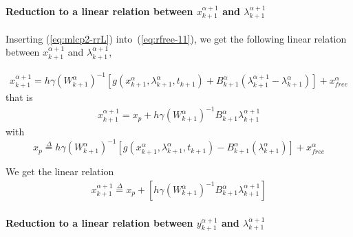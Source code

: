 \paragraph{Reduction to a linear relation between  $x^{\alpha+1}_{k+1}$ and
$\lambda^{\alpha+1}_{k+1}$}

Inserting (\ref{eq:mlcp2-rrL}) into~(\ref{eq:rfree-11}), we get the following linear relation between $x^{\alpha+1}_{k+1}$ and
$\lambda^{\alpha+1}_{k+1}$, 

\begin{equation}
   \begin{array}{l}
     x^{\alpha+1}_{k+1} = h\gamma(W^{\alpha}_{k+1} )^{-1}\left[g(x^{\alpha}_{k+1},\lambda^{\alpha}_{k+1},t_{k+1}) +
    B^{\alpha}_{k+1} (\lambda^{\alpha+1}_{k+1} - \lambda^{\alpha}_{k+1}) \right ] +x^\alpha_{free}
\end{array}
\end{equation}
that is 
\begin{equation}
  \begin{array}{l}
   x^{\alpha+1}_{k+1} =x_p + h \gamma (W^{\alpha}_{k+1})^{-1}    B^{\alpha}_{k+1} \lambda^{\alpha+1}_{k+1}
   \end{array}
\end{equation}
with 
\begin{equation}
  \boxed{x_p \stackrel{\Delta}{=}  h\gamma(W^{\alpha}_{k+1} )^{-1}\left[g(x^{\alpha}_{k+1},\lambda^{\alpha}_{k+1},t_{k+1}) 
    -B^{\alpha}_{k+1} (\lambda^{\alpha}_{k+1}) \right ] +x^\alpha_{free}}
\end{equation}


We get the linear relation
\begin{equation}
  \label{eq:mlcp2-rfree-13}
  \begin{array}{l}
 \boxed{   x^{\alpha+1}_{k+1}\stackrel{\Delta}{=} x_p + \left[ h \gamma (W^{\alpha}_{k+1})^{-1}    B^{\alpha}_{k+1} \lambda^{\alpha+1}_{k+1}\right]}
   \end{array}
\end{equation}




\paragraph{Reduction to a linear relation between  $y^{\alpha+1}_{k+1}$ and
$\lambda^{\alpha+1}_{k+1}$}

